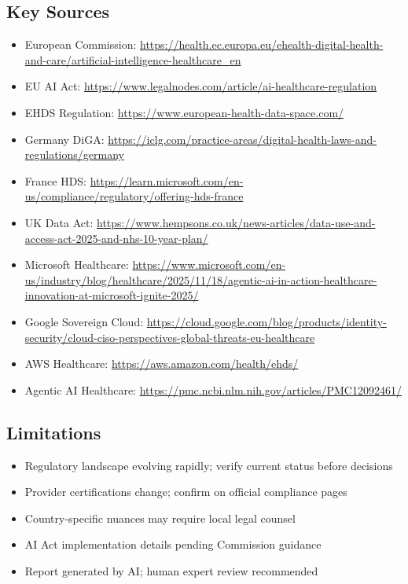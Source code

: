 \documentclass[11pt,a4paper]{article}
\begin{document}
\subsection{Key Sources}

\begin{itemize}
    \item European Commission: \url{https://health.ec.europa.eu/ehealth-digital-health-and-care/artificial-intelligence-healthcare_en}
    \item EU AI Act: \url{https://www.legalnodes.com/article/ai-healthcare-regulation}
    \item EHDS Regulation: \url{https://www.european-health-data-space.com/}
    \item Germany DiGA: \url{https://iclg.com/practice-areas/digital-health-laws-and-regulations/germany}
    \item France HDS: \url{https://learn.microsoft.com/en-us/compliance/regulatory/offering-hds-france}
    \item UK Data Act: \url{https://www.hempsons.co.uk/news-articles/data-use-and-access-act-2025-and-nhs-10-year-plan/}
    \item Microsoft Healthcare: \url{https://www.microsoft.com/en-us/industry/blog/healthcare/2025/11/18/agentic-ai-in-action-healthcare-innovation-at-microsoft-ignite-2025/}
    \item Google Sovereign Cloud: \url{https://cloud.google.com/blog/products/identity-security/cloud-ciso-perspectives-global-threats-eu-healthcare}
    \item AWS Healthcare: \url{https://aws.amazon.com/health/ehds/}
    \item Agentic AI Healthcare: \url{https://pmc.ncbi.nlm.nih.gov/articles/PMC12092461/}
\end{itemize}

\subsection{Limitations}

\begin{itemize}
    \item Regulatory landscape evolving rapidly; verify current status before decisions
    \item Provider certifications change; confirm on official compliance pages
    \item Country-specific nuances may require local legal counsel
    \item AI Act implementation details pending Commission guidance
    \item Report generated by AI; human expert review recommended
\end{itemize}
\end{document}
